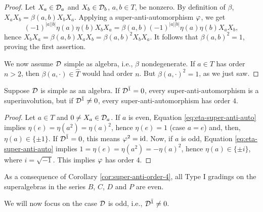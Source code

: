 \documentclass{amsbook}
\begin{document}
\begin{proof}
    Let $X_a\in \mathcal{D}_a$ and $X_b\in \mathcal{D}_b$, $a,b\in T$, be nonzero.
    By definition of $\beta$, $X_a X_b = \beta(a,b) X_b X_a$.
    Applying a super-anti-automorphism $\varphi$, we get \[(-1)^{|a||b|} \eta(a) \eta(b) X_b X_a = \beta(a,b) (-1)^{|a||b|} \eta(a) \eta(b) X_a X_b,\] hence $X_b X_a = \beta(a,b) X_a X_b = \beta(a,b)^2 X_b X_a$.
    It follows that $\beta(a,b)^2 = 1$, proving the first assertion.
    
    We now assume $\mathcal{D}$ simple as algebra, i.e., $\beta$ nondegenerate.
    If $a\in T$ has order $n>2$, then $\beta(a, \cdot)\in \widehat T$ would had order $n$.
    But $\beta(a, \cdot )^2 =1$, as we just saw.
\end{proof}

\begin{cor}\label{cor:super-anti-order-4}
    Suppose $\mathcal{D}$ is simple as an algebra.
    If $\mathcal{D}^{\bar1} = 0$, every super-anti-automorphism is a superinvolution, but if $\mathcal{D}^{\bar1} \neq 0$, every super-anti-automorphism has order $4$.
\end{cor}

\begin{proof}
    Let $a\in T$ and $0 \neq X_a \in \mathcal{D}_a$. If $a$ is even, Equation \eqref{eq:eta-super-anti-auto} implies $\eta(e) = \eta (a^2) = \eta(a)^2$, hence $\eta(e) = 1$ (case $a=e$) and, then,  $\eta(a) \in \{ \pm 1 \}$. If $\mathcal{D}^{\bar1} = 0$, this means $\varphi^2 = \operatorname{id}$. Now, if $a$ is odd, Equation \eqref{eq:eta-super-anti-auto} implies $1 = \eta(e) = \eta (a^2) = - \eta(a)^2$, hence $\eta(a) \in \{ \pm i \}$, where $i = \sqrt{-1}$. This implies $\varphi$ has order $4$.
\end{proof}

As a consequence of Corollary \ref{cor:super-anti-order-4}, all Type I gradings on the superalgebras in the series $B$, $C$, $D$ and $P$ are even.

We will now focus on the case $\mathcal{D}$ is odd, i.e., $\mathcal{D}^{\bar1} \neq 0$.
\end{document}
